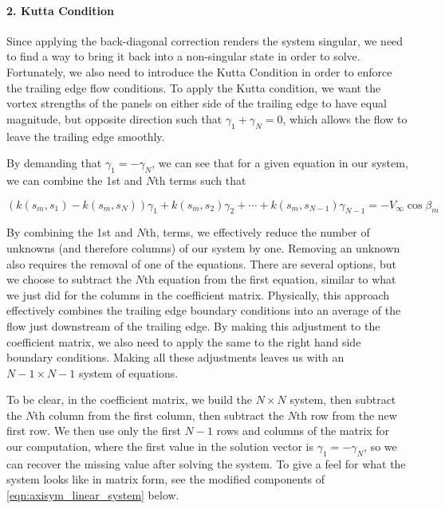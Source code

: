 \paragraph{2. Kutta Condition}

Since applying the back-diagonal correction renders the system singular, we need to find a way to bring it back into a non-singular state in order to solve.
Fortunately, we also need to introduce the Kutta Condition in order to enforce the trailing edge flow conditions.
To apply the Kutta condition, we want the vortex strengths of the panels on either side of the trailing edge to have equal magnitude, but opposite direction such that \(\gamma_1 + \gamma_N = 0\), which allows the flow to leave the trailing edge smoothly.

By demanding that  \(\gamma_1 = - \gamma_N\), we can see that for a given equation in our system, we can combine the 1st and \(N\)th terms such that

\begin{equation}
	(k(s_m, s_1)-k(s_m, s_N))\gamma_1 + k(s_m, s_2)\gamma_2 + \cdots + k(s_m, s_{N-1})\gamma_{N-1} = - V_\infty \cos \beta_m
\end{equation}

By combining the 1st and \(N\)th, terms, we effectively reduce the number of unknowns (and therefore columns) of our system by one.
Removing an unknown also requires the removal of one of the equations.
There are several options, but we choose to subtract the \(N\)th equation from the first equation, similar to what we just did for the columns in the coefficient matrix.
Physically, this approach effectively combines the trailing edge boundary conditions into an average of the flow just downstream of the trailing edge.
By making this adjustment to the coefficient matrix, we also need to apply the same to the right hand side boundary conditions.
Making all these adjustments leaves us with an \(N-1 \times N-1\) system of equations.

To be clear, in the coefficient matrix, we build the \(N\times N\) system, then subtract the \(N\)th column from the first column, then subtract the \(N\)th row from the new first row.
We then use only the first \(N-1\) rows and columns of the matrix for our computation, where the first value in the solution vector is \(\gamma_1=-\gamma_N\), so we can recover the missing value after solving the system.
To give a feel for what the system looks like in matrix form, see the modified components of \cref{eqn:axisym_linear_system} below.

